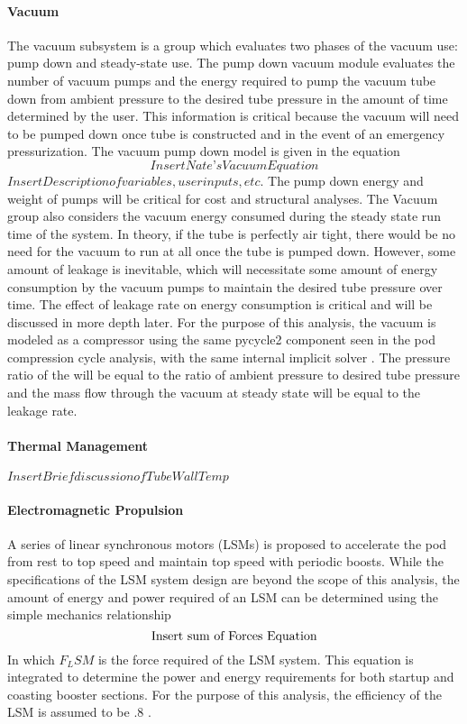 \paragraph{Vacuum}
	The vacuum subsystem is a group which evaluates two phases of the vacuum use: pump down and steady-state use. The pump down vacuum module evaluates the number of vacuum pumps and the energy required to pump the vacuum tube down from ambient pressure to the desired tube pressure in the amount of time determined by the user. This information is critical because the vacuum will need to be pumped down once tube is constructed and in the event of an emergency pressurization. The vacuum pump down model is given in the equation
	\begin{equation}
		\label{eq:vacuum}
		Insert Nate’s Vacuum Equation
	\end{equation}
	$Insert Description of variables, user inputs, etc.$
	The pump down energy and weight of pumps will be critical for cost and structural analyses.
	The Vacuum group also considers the vacuum energy consumed during the steady state run time of the system. In theory, if the tube is perfectly air tight, there would be no need for the vacuum to run at all once the tube is pumped down. However, some amount of leakage is inevitable, which will necessitate some amount of energy consumption by the vacuum pumps to maintain the desired tube pressure over time. The effect of leakage rate on energy consumption is critical and will be discussed in more depth later. For the purpose of this analysis, the vacuum is modeled as a compressor using the same pycycle2 component seen in the pod compression cycle analysis, with the same internal implicit solver \cite{pycycle2}. The pressure ratio of the will be equal to the ratio of ambient pressure to desired tube pressure and the mass flow through the vacuum at steady state will be equal to the leakage rate.
\paragraph{Thermal Management}
	$Insert Brief discussion of Tube Wall Temp$  \cite{Chin}
\paragraph{Electromagnetic Propulsion}
	A series of linear synchronous motors (LSMs) is proposed to accelerate the pod from rest to top speed and maintain top speed with periodic boosts. While the specifications of the LSM system design are beyond the scope of this analysis, the amount of energy and power required of an LSM can be determined using the simple mechanics relationship
	\begin{equation}
		\label{eq:sum_of_forces}
		$Insert sum of Forces Equation$
	\end{equation}
	In which $F_LSM$ is the force required of the LSM system. This equation is integrated to determine the power and energy requirements for both startup and coasting booster sections. For the purpose of this analysis, the efficiency of the LSM is assumed to be .8 \cite{LSM}.
